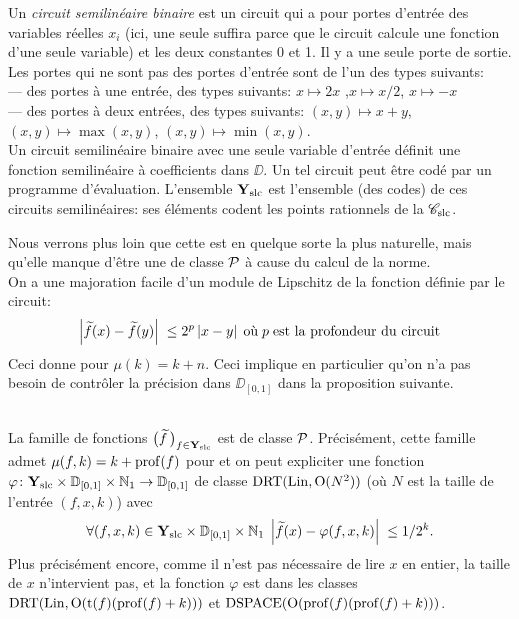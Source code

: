 \begin{fdefinition} \label{f321}
Un {\em  circuit semilinéaire binaire} est un circuit qui a pour portes 
d'entrée des variables réelles  $x_i $  (ici, une seule suffira parce que 
le circuit calcule une fonction d'une seule variable) et les deux constantes  0  
et  1. Il y a une seule porte de sortie.\\
Les portes qui ne sont pas des portes d'entrée sont de l'un des types 
suivants:\\
--- des portes à une entrée, des types suivants:  $x \mapsto 2x$ ,$x 
\mapsto x/2$, $x \mapsto -x$\\ 
--- des portes à deux entrées, des types suivants:  
$(x,y) \mapsto x + y$, $(x,y) \mapsto \max(x,y)$, $(x,y) \mapsto \min(x,y)$.\\ 
Un circuit semilinéaire binaire avec une seule variable d'entrée définit 
une fonction semilinéaire à coefficients dans  $\DD$. Un tel circuit peut 
être codé par un programme d'évaluation. L'ensemble  ${{\bf Y}_{\rm slc}}$   est 
l'ensemble (des codes) de ces circuits semilinéaires: ses éléments codent les 
points rationnels de la \pres  ${{{\mathscr C}}_{\rm slc}}$.
\end{fdefinition}

Nous verrons plus loin que cette \pres est en quelque sorte la plus naturelle, 
mais qu'elle manque d'être une \pres de classe  ${\cal P}$   à cause du calcul de 
la norme.\\
On a une majoration facile d'un module de Lipschitz de la fonction définie par le circuit:  
\[
\left|{\widetilde{f}(x) - \widetilde{f}(y)}\right|\;  \leq 2^p \left|{ x- y}\right| \; \hbox{où} \; p \;  \hbox{est la profondeur du circuit}
\]
Ceci donne pour \mcu  $\mu(k) = k+n$.  Ceci implique en particulier qu'on n'a 
pas besoin de contrôler la précision dans  $\DD_{[0,1]}$   dans la 
proposition suivante.  

\begin{fproposition} \label{f322}
~ \\
La famille de fonctions  $\big(\widetilde{f}\,\big)_{f \in {{\bf Y}_{\rm slc}} }$  est  \uni de classe  
${\cal P}$. Précisément, cette famille admet  
$\mu(f,k) = k+{\rm prof}(f)$
  pour  \mcu et on peut expliciter une fonction  $\varphi \colon  {{\bf Y}_{\rm slc}}  \times \mathbb {D}_{[0,1]} 
\times \mathbb {N}_1 \rightarrow \mathbb {D}_{[0,1]}$   de classe ${\rm DRT}({\rm Lin}, {\rm O}(N^2))$  (où $N$ est 
la taille de l'entrée  $(f,x,k)$)  avec
\[
 \forall (f, x, k) \in {{\bf Y}_{\rm slc}}  \times 
\mathbb {D}_{[0,1]} \times \mathbb {N}_1 \;
\left|{\widetilde{f}(x) - \varphi(f,x,k)}\right|\;  \leq 1/2^k.
\]
Plus précisément encore, comme il n'est pas nécessaire de lire $x$ en 
entier,  la taille de $x$ n'intervient pas, et la fonction  $\varphi$   est dans 
les classes  ${\rm DRT}({\rm Lin}, {\rm O}({\rm t}(f)({\rm prof}(f)+k)))$  et  ${\rm DSPACE}({\rm O}({\rm prof}(f) 
({\rm prof}(f)+k)))$.
\end{fproposition}

